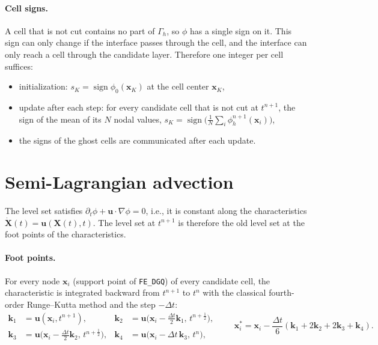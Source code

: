 \documentclass[11pt,a4paper]{article}
\newcommand{\x}{\bm{x}}
\newcommand{\uu}{\bm{u}}
\begin{document}
\paragraph{Cell signs.}
A cell that is not cut contains no part of $\Gamma_h$, so $\phi$ has a single sign on it. This sign
can only change if the interface passes through the cell, and the interface can only reach a cell
through the candidate layer. Therefore one integer per cell suffices:
\begin{itemize}
  \item initialization: $s_K = \operatorname{sign} \phi_0(\x_K)$ at the cell center $\x_K$,
  \item update after each step: for every candidate cell that is not cut at $t^{n+1}$, the sign of
  the mean of its $N$ nodal values,
  $s_K = \operatorname{sign}\big(\tfrac{1}{N}\sum_{i} \phi_h^{n+1}(\x_i)\big)$,
  \item the signs of the ghost cells are communicated after each update.
\end{itemize}

\FloatBarrier
\section{Semi-Lagrangian advection}
\label{sec:sl}

The level set satisfies $\partial_t \phi + \uu \cdot \nabla \phi = 0$, i.e., it is constant along
the characteristics $\dot{\bm{X}}(t) = \uu(\bm{X}(t), t)$. The level set at $t^{n+1}$ is therefore
the old level set at the foot points of the characteristics.

\paragraph{Foot points.}
For every node $\x_i$ (support point of \texttt{FE\_DGQ}) of every candidate cell, the
characteristic is integrated backward from $t^{n+1}$ to $t^{n}$ with the classical fourth-order
Runge--Kutta method and the step $-\Delta t$:
\begin{equation}
\begin{aligned}
\bm{k}_1 &= \uu(\x_i, t^{n+1}), &
\bm{k}_2 &= \uu\big(\x_i - \tfrac{\Delta t}{2}\bm{k}_1,\, t^{n+\frac12}\big),\\
\bm{k}_3 &= \uu\big(\x_i - \tfrac{\Delta t}{2}\bm{k}_2,\, t^{n+\frac12}\big), &
\bm{k}_4 &= \uu\big(\x_i - \Delta t\,\bm{k}_3,\, t^{n}\big),
\end{aligned}
\qquad
\x_i^* = \x_i - \frac{\Delta t}{6}\left(\bm{k}_1 + 2\bm{k}_2 + 2\bm{k}_3 + \bm{k}_4\right).
\end{equation}
\end{document}
